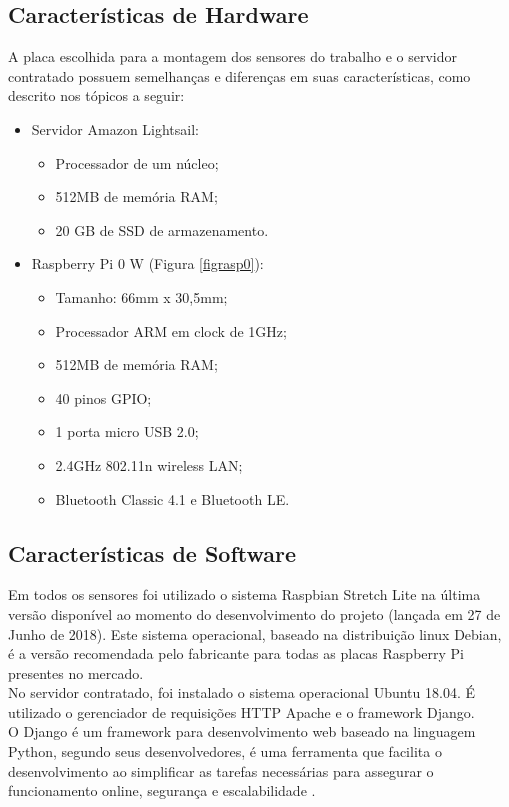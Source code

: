 \subsection{Características de Hardware}
\quad A placa escolhida para a montagem dos sensores do trabalho e o servidor contratado possuem semelhanças e diferenças em suas características, como descrito nos tópicos a seguir:
\begin{itemize}
  \item Servidor Amazon Lightsail:
  \begin{itemize}
    \item Processador de um núcleo;
    \item 512MB de memória RAM;
    \item 20 GB de SSD de armazenamento.
  \end{itemize}
  \item Raspberry Pi 0 W (Figura \ref{figrasp0}):
  \begin{itemize}
    \item Tamanho: 66mm x 30,5mm;
    \item Processador ARM em clock de 1GHz;
    \item 512MB de memória RAM;
    \item 40 pinos GPIO;
    \item 1 porta micro USB 2.0;
    \item 2.4GHz 802.11n wireless LAN;
    \item Bluetooth Classic 4.1 e Bluetooth LE.
  \end{itemize}
\end{itemize}
\subsection{Características de Software}
\quad Em todos os sensores foi utilizado o sistema Raspbian Stretch Lite na última versão disponível ao momento do desenvolvimento do projeto (lançada em 27 de Junho de 2018).
Este sistema operacional, baseado na distribuição linux Debian, é a versão recomendada pelo fabricante para todas as placas Raspberry Pi presentes no mercado.
\\\null\quad No servidor contratado, foi instalado o sistema operacional Ubuntu 18.04. É utilizado o gerenciador de requisições HTTP Apache e o framework Django.
\\\null\quad O Django é um framework para desenvolvimento web baseado na linguagem Python, segundo seus desenvolvedores, é uma ferramenta que facilita o desenvolvimento ao simplificar as tarefas necessárias para assegurar o funcionamento online, segurança e escalabilidade \cite{django}.
